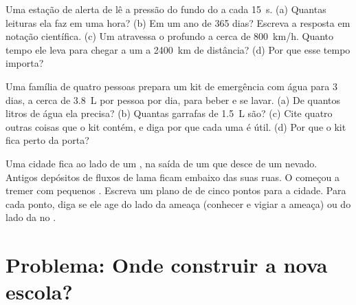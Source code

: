 \begin{exercise}[$\star\star$]\label{exo:g9:natural-risks:10}
Uma estação de alerta de  lê a pressão do fundo do  a cada
\qty{15}{s}. (a) Quantas leituras ela faz em uma hora? (b) Em um ano de
365 dias? Escreva a resposta em notação científica. (c) Um 
atravessa o  profundo a cerca de \qty{800}{km/h}. Quanto tempo ele
leva para chegar a um  a \qty{2400}{km} de distância? (d) Por que
esse tempo importa?
\end{exercise}

\begin{exercise}[$\star\star\star$]\label{exo:g9:natural-risks:11}
Uma família de quatro pessoas prepara um kit de emergência com água para
3 dias, a cerca de \qty{3.8}{L} por pessoa por dia, para beber e se
lavar. (a) De quantos litros de água ela precisa? (b) Quantas garrafas de
\qty{1.5}{L} são? (c) Cite quatro outras coisas que o kit contém, e diga
por que cada uma é útil. (d) Por que o kit fica perto da porta?
\end{exercise}

\begin{exercise}[$\star\star\star$]\label{exo:g9:natural-risks:12}
Uma cidade fica ao lado de um , na saída de um  que desce de um
 nevado. Antigos depósitos de fluxos de lama ficam embaixo das suas
ruas. O  começou a tremer com pequenos . Escreva um plano
de  de cinco pontos para a cidade. Para cada ponto, diga se ele
age do lado da ameaça (conhecer e vigiar a ameaça) ou do lado da
 no .
\end{exercise}

\section{Problema: Onde construir a nova escola?}

